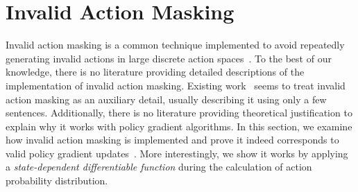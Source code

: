 \documentclass[letterpaper]{article}
\begin{document}
\section{Invalid Action Masking}
Invalid action masking is a common technique implemented to avoid repeatedly generating invalid actions in large discrete action spaces~\cite{vinyals2017starcraft,Berner2019Dota2W,ye2019mastering}. To the best of our knowledge, there is no literature providing detailed descriptions of the implementation of invalid action masking. Existing work~\cite{vinyals2017starcraft,Berner2019Dota2W} seems to treat invalid action masking as an auxiliary detail, usually describing it using only a few sentences. Additionally, there is no literature providing theoretical justification to explain why it works with policy gradient algorithms. In this section, we examine how invalid action masking is implemented and prove it indeed corresponds to valid policy gradient updates~\cite{sutton2000policy}. More interestingly, we show it works by applying a \emph{state-dependent differentiable function} during the calculation of action probability distribution.
\end{document}
